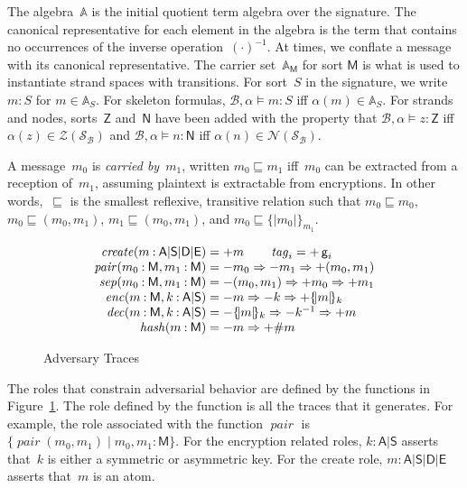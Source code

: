 \documentclass[12pt]{article}
\newcommand{\cn}[1]{\ensuremath{\operatorname{\mathsf{#1}}}}
\newcommand{\fn}[1]{\ensuremath{\operatorname{\mathit{#1}}}}
\newcommand{\srt}[1]{\ensuremath{\mathsf{#1}}}
\newcommand{\typ}{\mathbin:}
\newcommand{\enc}[2]{\ensuremath{\{\!|#1|\!\}_{#2}}}
\newcommand{\invk}[1]{{#1}^{-1}}
\newcommand{\tg}[1]{\cn{g}_{#1}}
\newcommand{\inbnd}{\mathord -}
\newcommand{\outbnd}{\mathord +}
\newcommand{\alg}{\ensuremath{\mathbb{A}}}
\newcommand{\ssp}{\ensuremath{\mathcal{S}}}
\newcommand{\bun}{\ensuremath{\mathcal{B}}}
\newcommand{\strands}{\ensuremath{\mathcal{Z}}}
\newcommand{\nodes}{\ensuremath{\mathcal{N}}}
\newcommand{\key}{\srt{A}|\srt{S}}
\newcommand{\base}{\key|\srt{D}|\srt{E}}
\begin{document}
The algebra~{\alg} is the initial quotient term algebra over the
signature.  The canonical representative for each element in the
algebra is the term that contains no occurrences of the inverse
operation~$\invk{(\cdot)}$.  At times, we conflate a message with its
canonical representative.  The carrier set~$\alg_\srt{M}$ for sort
\srt{M} is what is used to instantiate strand spaces with transitions.
For sort~$S$ in the signature, we write $m\typ S$ for $m\in\alg_S$.
For skeleton formulas, $\bun,\alpha\models m\typ S$ iff
$\alpha(m)\in\alg_S$.  For strands and nodes, sorts~\srt{Z}
and~\srt{N} have been added with the property that $\bun,\alpha\models
z\typ\srt{Z}$ iff $\alpha(z)\in\strands(\ssp_\bun)$ and
$\bun,\alpha\models n\typ\srt{N}$ iff $\alpha(n)\in\nodes(\ssp_\bun)$.

A message~$m_0$ is \emph{carried by}~$m_1$, written $m_0\sqsubseteq
m_1$ iff~$m_0$ can be extracted from a reception of~$m_1$, assuming
plaintext is extractable from encryptions.  In other
words,~$\sqsubseteq$ is the smallest reflexive, transitive relation
such that $m_0\sqsubseteq m_0$, $m_0\sqsubseteq (m_0, m_1)$,
$m_1\sqsubseteq (m_0, m_1)$, and $m_0\sqsubseteq\enc{m_0}{m_1}$.

\begin{figure}
$$\begin{array}{r@{{}={}}l}
\fn{create}(m\typ\base)&\outbnd m\qquad\fn{tag}_i=\outbnd\tg{i}\\
\fn{pair}(m_0\typ\srt{M}, m_1\typ\srt{M})&
\inbnd m_0\Rightarrow\inbnd m_1\Rightarrow\outbnd (m_0,m_1)\\
\fn{sep}(m_0\typ\srt{M}, m_1\typ\srt{M})&
\inbnd (m_0, m_1)\Rightarrow\outbnd m_0\Rightarrow\outbnd m_1\\
\fn{enc}(m\typ\srt{M}, k\typ\srt{A}|\srt{S})&
\inbnd m\Rightarrow\inbnd k\Rightarrow\outbnd \enc{m}{k}\\
\fn{dec}(m\typ\srt{M}, k\typ\key)&
\inbnd \enc{m}{k}\Rightarrow\inbnd\invk{k}\Rightarrow\outbnd m\\
\fn{hash}(m\typ\srt{M})&
\inbnd m\Rightarrow\outbnd \#m
\end{array}$$
\caption{Adversary Traces}\label{fig:adversary}
\end{figure}

The roles that constrain adversarial behavior are defined by the
functions in Figure~\ref{fig:adversary}.  The role defined by the
function is all the traces that it generates.  For example, the role
associated with the function \fn{pair} is $\{\fn{pair}(m_0,m_1)\mid
m_0,m_1\typ\srt{M}\}$.  For the encryption related roles, $k\typ\key$
asserts that~$k$ is either a symmetric or asymmetric key.  For the
create role, $m\typ\base$ asserts that~$m$ is an atom.
\end{document}
